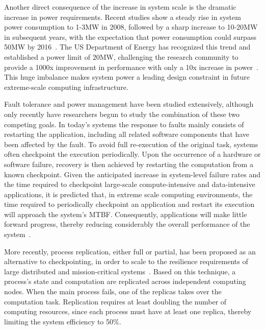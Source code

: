 Another direct consequence of the increase in system scale is the dramatic increase in power requirements. Recent studies show a steady rise in system power consumption to 1-3MW in 2008, followed by a sharp increase to 10-20MW in subsequent years, with the expectation that power consumption could surpass 50MW by 2016~\cite{doe_ascr_exascale_2011}. The US Department of Energy has recognized this trend and established a power limit of 20MW, challenging the research community to provide a 1000x improvement in performance with only a 10x increase in power~\cite{doe_ascr_exascale_2011}. %
This huge imbalance makes system power a leading design constraint in future extreme-scale computing infrastructure.


Fault tolerance and power management have been studied extensively, although only recently have researchers begun to study the combination of these two competing goals. In today's systems the response to faults mainly consists of restarting the application, including all related software components that have been affected by the fault. To avoid full re-execution of the original task, systems often checkpoint the execution periodically. Upon the occurrence of a hardware or software failure, recovery is then achieved by restarting the computation from a known checkpoint. Given the anticipated increase in system-level failure rates and the time required to checkpoint large-scale compute-intensive and data-intensive applications, it is predicted that, in extreme scale computing environments, the time required to periodically checkpoint an application and restart its execution will approach the system's MTBF. Consequently, applications will make little forward progress, thereby reducing considerably the overall performance of the system~\cite{riesen_sandia_2010}.%

More recently, process replication, either full or partial, has been proposed as an alternative to checkpointing, in order to scale to the resilience requirements of large distributed and mission-critical systems~\cite{fiala_2012_sdc,riesen_sandia_2010}. Based on this technique, a process's state and computation are replicated across independent computing
nodes. When the main process fails, one of the replicas takes over the computation task. Replication 
requires at least doubling the number of computing resources, since each process must have at least one replica, thereby 
limiting the system efficiency to 50\%.

